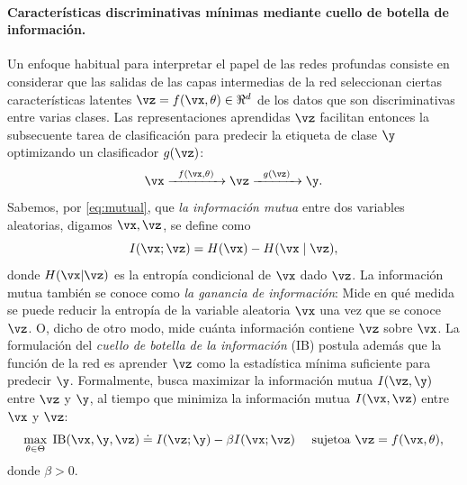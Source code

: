 \documentclass[../../book-main.tex]{subfiles}
\begin{document}
\paragraph{Características discriminativas mínimas mediante cuello de botella de información.}
Un enfoque habitual para interpretar el papel de las redes profundas consiste en
considerar que las salidas de las capas intermedias de la red seleccionan
ciertas características latentes $\vz = f(\vx, \theta) \in \Re^d$ de los datos
que son discriminativas entre varias clases. Las representaciones
aprendidas $\vz$ facilitan entonces la subsecuente tarea de clasificación
para predecir la etiqueta de clase $\y$ optimizando un clasificador $g(\vz)$:
\begin{equation}
    \vx   \xrightarrow{\hspace{2mm} f(\vx, \theta)\hspace{2mm}} \vz
    \xrightarrow{\hspace{2mm} g(\vz) \hspace{2mm}} \y.
\end{equation}
Sabemos, por \eqref{eq:mutual}, que {\em la
información mutua} entre dos variables aleatorias, digamos $\vx,\vz$, se
define como
\begin{equation}
    I(\vx; \vz) = H(\vx) - H(\vx\mid \vz),
\end{equation}
donde $H(\vx \vert \vz)$ es la entropía condicional de $\vx$ dado $\vz$.
La información mutua también se conoce como {\em la ganancia de información}:
Mide en qué medida se puede reducir la entropía de la variable aleatoria $\vx$
una vez que se conoce $\vz$. O, dicho de otro modo, mide cuánta
información contiene $\vz$ sobre $\vx$. La formulación del {\em cuello de botella de la información
} (IB) \cite{Tishby-ITW2015} postula además
que la función de la red es aprender $\vz$ como la
estadística mínima suficiente para predecir $\y$. Formalmente, busca
maximizar la información mutua $I(\vz, \y)$
entre $\vz$ y $\y$, al tiempo que minimiza la información mutua $I(\vx,
\vz)$ entre $\vx$ y $\vz$:
\begin{equation}
    \max_{\theta\in \Theta}\; \mbox{IB}(\vx, \y, \vz) \doteq I(\vz; \y) -
    \beta I(\vx; \vz) \quad\ \mathrm{sujeto a}\ \vz = f(\vx, \theta),
    \label{chap4-eqn:information-bottleneck}
\end{equation}
donde $\beta >0$.
\end{document}
